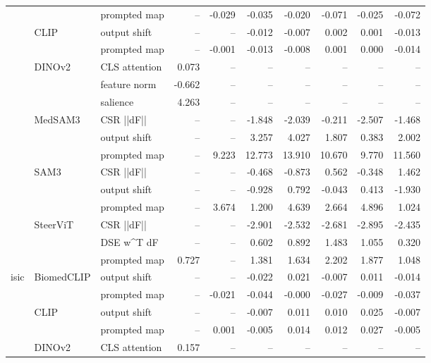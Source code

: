 \begin{tabular}{lllrrrrrrr}
 &  & prompted map & -- & -0.029 & -0.035 & -0.020 & -0.071 & -0.025 & -0.072 \\
\cline{2-10}
 & \multirow[t]{2}{*}{CLIP} & output shift & -- & -- & -0.012 & -0.007 & 0.002 & 0.001 & -0.013 \\
 &  & prompted map & -- & -0.001 & -0.013 & -0.008 & 0.001 & 0.000 & -0.014 \\
\cline{2-10}
 & \multirow[t]{3}{*}{DINOv2} & CLS attention & 0.073 & -- & -- & -- & -- & -- & -- \\
 &  & feature norm & -0.662 & -- & -- & -- & -- & -- & -- \\
 &  & salience & 4.263 & -- & -- & -- & -- & -- & -- \\
\cline{2-10}
 & \multirow[t]{3}{*}{MedSAM3} & CSR  ||dF|| & -- & -- & -1.848 & -2.039 & -0.211 & -2.507 & -1.468 \\
 &  & output shift & -- & -- & 3.257 & 4.027 & 1.807 & 0.383 & 2.002 \\
 &  & prompted map & -- & 9.223 & 12.773 & 13.910 & 10.670 & 9.770 & 11.560 \\
\cline{2-10}
 & \multirow[t]{3}{*}{SAM3} & CSR  ||dF|| & -- & -- & -0.468 & -0.873 & 0.562 & -0.348 & 1.462 \\
 &  & output shift & -- & -- & -0.928 & 0.792 & -0.043 & 0.413 & -1.930 \\
 &  & prompted map & -- & 3.674 & 1.200 & 4.639 & 2.664 & 4.896 & 1.024 \\
\cline{2-10}
 & \multirow[t]{3}{*}{SteerViT} & CSR  ||dF|| & -- & -- & -2.901 & -2.532 & -2.681 & -2.895 & -2.435 \\
 &  & DSE  w^T dF & -- & -- & 0.602 & 0.892 & 1.483 & 1.055 & 0.320 \\
 &  & prompted map & 0.727 & -- & 1.381 & 1.634 & 2.202 & 1.877 & 1.048 \\
\cline{1-10} \cline{2-10}
\multirow[t]{16}{*}{isic} & \multirow[t]{2}{*}{BiomedCLIP} & output shift & -- & -- & -0.022 & 0.021 & -0.007 & 0.011 & -0.014 \\
 &  & prompted map & -- & -0.021 & -0.044 & -0.000 & -0.027 & -0.009 & -0.037 \\
\cline{2-10}
 & \multirow[t]{2}{*}{CLIP} & output shift & -- & -- & -0.007 & 0.011 & 0.010 & 0.025 & -0.007 \\
 &  & prompted map & -- & 0.001 & -0.005 & 0.014 & 0.012 & 0.027 & -0.005 \\
\cline{2-10}
 & \multirow[t]{3}{*}{DINOv2} & CLS attention & 0.157 & -- & -- & -- & -- & -- & -- \\

\end{tabular}
